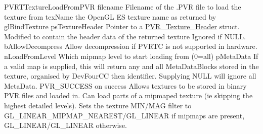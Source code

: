   P\+V\+R\+T\+Texture\+Load\+From\+P\+V\+R  filename Filename of the .P\+V\+R file to load the texture from  tex\+Name the Open\+G\+L E\+S texture name as returned by gl\+Bind\+Texture  ps\+Texture\+Header Pointer to a \hyperlink{struct_p_v_r___texture___header}{P\+V\+R\+\_\+\+Texture\+\_\+\+Header} struct. Modified to contain the header data of the returned texture Ignored if N\+U\+L\+L.  b\+Allow\+Decompress Allow decompression if P\+V\+R\+T\+C is not supported in hardware.  n\+Load\+From\+Level Which mipmap level to start loading from (0=all)  p\+Meta\+Data If a valid map is supplied, this will return any and all Meta\+Data\+Blocks stored in the texture, organised by Dev\+Four\+C\+C then identifier. Supplying N\+U\+L\+L will ignore all Meta\+Data.  P\+V\+R\+\_\+\+S\+U\+C\+C\+E\+S\+S on success  Allows textures to be stored in binary P\+V\+R files and loaded in. Can load parts of a mipmaped texture (ie skipping the highest detailed levels). Sets the texture M\+I\+N/\+M\+A\+G filter to G\+L\+\_\+\+L\+I\+N\+E\+A\+R\+\_\+\+M\+I\+P\+M\+A\+P\+\_\+\+N\+E\+A\+R\+E\+S\+T/\+G\+L\+\_\+\+L\+I\+N\+E\+A\+R if mipmaps are present, G\+L\+\_\+\+L\+I\+N\+E\+A\+R/\+G\+L\+\_\+\+L\+I\+N\+E\+A\+R otherwise. 